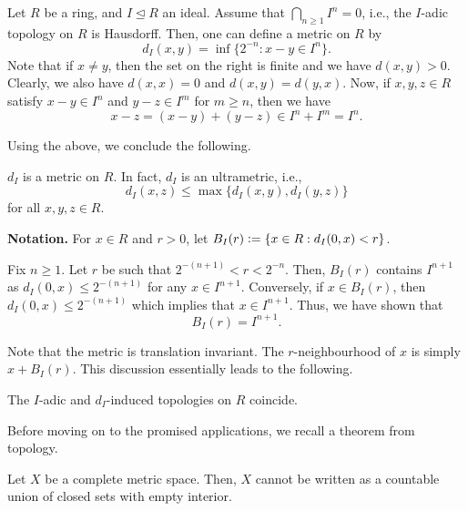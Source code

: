 Let $R$ be a ring, and $I \unlhd R$ an ideal. Assume that $\bigcap_{n \ge 1} I^{n} = 0$, i.e., the $I$-adic topology on $R$ is Hausdorff. Then, one can define a metric on $R$ by
\begin{equation*} 
	d_{I}(x, y) = \inf \{2^{-n} : x - y \in I^{n}\}.
\end{equation*}
Note that if $x \neq y$, then the set on the right is finite and we have $d(x, y) > 0$. Clearly, we also have $d(x, x) = 0$ and $d(x, y) = d(y, x)$. Now, if $x, y, z \in R$ satisfy $x - y \in I^{n}$ and $y - z \in I^{m}$ for $m \ge n$, then we have
\begin{equation*} 
	x - z = (x - y) + (y - z) \in I^{n} + I^{m} = I^{n}.
\end{equation*}

Using the above, we conclude the following.

\begin{prop}
	$d_{I}$ is a metric on $R$. In fact, $d_{I}$ is an ultrametric, i.e.,
	\begin{equation*} 
		d_{I}(x, z) \le \max\{d_{I}(x, y), d_{I}(y, z)\}
	\end{equation*}
	for all $x, y, z \in R$.
\end{prop}

\textbf{Notation.} For $x \in R$ and $r > 0$, let $B_{I}(r) \vcentcolon= \{x \in R : d_{I}(0, x) < r\}$.

Fix $n \ge 1$. Let $r$ be such that $2^{-(n + 1)} < r < 2^{-n}$. Then, $B_{I}(r)$ contains $I^{n + 1}$ as $d_{I}(0, x) \le 2^{-(n + 1)}$ for any $x \in I^{n + 1}$. Conversely, if $x \in B_{I}(r)$, then $d_{I}(0, x) \le 2^{-(n + 1)}$ which implies that $x \in I^{n + 1}$. Thus, we have shown that
\begin{equation*} 
	B_{I}(r) = I^{n + 1}.
\end{equation*}

Note that the metric is translation invariant. The $r$-neighbourhood of $x$ is simply $x + B_{I}(r)$. This discussion essentially leads to the following.

\begin{prop}
	The $I$-adic and $d_{I}$-induced topologies on $R$ coincide.
\end{prop}

Before moving on to the promised applications, we recall a theorem from topology.

\begin{thm} \label{thm:BCT}
	Let $X$ be a complete metric space. Then, $X$ cannot be written as a countable union of closed sets with empty interior.
\end{thm}

